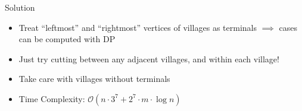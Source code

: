 \begin{frame}
{\begin{block}{Solution}
{\begin{itemize}
\begin{itemize}
            \end{itemize}
        \item Treat ``leftmost'' and ``rightmost'' vertices of villages as terminals
            \newline $\implies$ cases can be computed with DP
        \item Just try cutting between any adjacent villages, and within each village!
        \item Take care with villages without terminals 
        \item Time Complexity: $\mathcal O(n\cdot 3^7 + 2^7\cdot m\cdot\log n)$
    \end{itemize}
    }
    \end{block}
    }
\end{frame}
